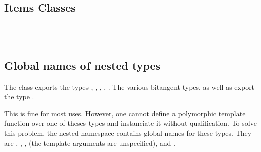 \subsection*{Items Classes}


\\
\\

\subsection*{Global names of nested types}

The class  exports
the types , , , ,
. The various bitangent types, as well as
 export the type .

This is fine for most uses. However, one cannot define a polymorphic
template function over one of theses types and instanciate it without
qualification. To solve this problem, the nested namespace
 contains global names for these
types. They are , , ,
 (the template arguments are unspecified),
 and .


